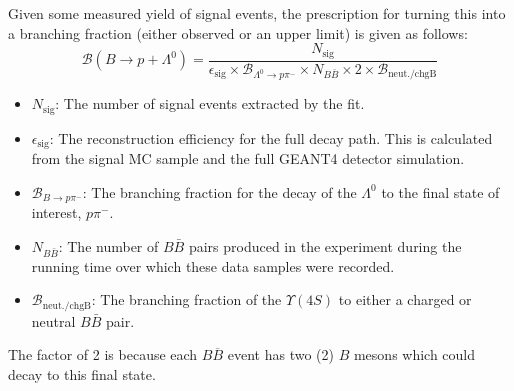 
Given some measured yield of signal events, the prescription for turning this into a branching fraction (either observed or an upper limit) is given as follows:
\[
    \mathcal{B}(B \to p + \Lambda^0) = \frac{N_{\text{sig}}}{\epsilon_{\text{sig}} \times \mathcal{B}_{\Lambda^0 \rightarrow p \pi^-} \times N_{B\bar{B}} \times 2 \times \mathcal{B}_{\text{neut./chgB}}}
\]

\begin{itemize}
  \item $N_{\text{sig}}$: The number of signal events extracted by the fit.
  \item $\epsilon_{\text{sig}}$: The reconstruction efficiency for the full decay path. This is calculated from the signal MC sample and the full GEANT4 detector simulation.
  \item $\mathcal{B}_{B\rightarrow p \pi^-}$: The branching fraction for the decay of the $\Lambda^0$ to the final state of interest, $p\pi^-$.
  \item $N_{B\bar{B}}$: The number of $B\bar{B}$ pairs produced in the experiment during the running time over which these data samples were recorded.
  \item $\mathcal{B}_{\text{neut./chgB}}$: The branching fraction of the $\Upsilon(4S)$ to either a charged or neutral $B\bar{B}$ pair.
\end{itemize}

The factor of 2 is because each $B\overline{B}$ event has two (2) $B$ mesons which could
decay to this final state.\\
